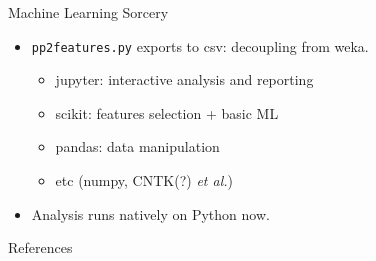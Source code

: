 \documentclass[pdf]
{beamer}
\begin{document}
\begin{frame}{Machine Learning Sorcery}
	\begin{itemize}
		\item \texttt{pp2features.py} exports to csv: decoupling from weka.
		\begin{itemize}
			\item jupyter: interactive analysis and reporting
			\item scikit: features selection + basic ML
			\item pandas: data manipulation
			\item etc (numpy, CNTK(?) \textit{et al.})
		\end{itemize}
		\item Analysis runs natively on Python now.
	\end{itemize}
\end{frame}


\begin{frame}{References}

\end{frame}
\end{document}

